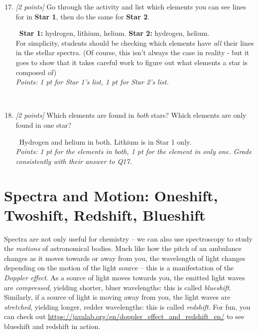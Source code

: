 \documentclass[11pt]{article}
\newcommand{\ans}[1]{%
  \par\smallskip\noindent{\color{blue!55!black}\textbf{Answer:}}\ #1\par\smallskip}
\begin{document}
\begin{enumerate}
    \setcounter{enumi}{16}

    \item \textit{[2 points]} Go through the activity and list which elements you can see lines for
    in \textbf{Star 1}, then do the same for \textbf{Star 2}. 

    \ans{\textbf{Star 1:} hydrogen, lithium, helium. \textbf{Star 2:} hydrogen,
    helium.  \\ For simplicity, students should be checking which elements
    have \textit{all} their lines in the stellar spectra. (Of course, this isn't always
    the case in reality - but it goes to show that it takes careful work to figure out
    what elements a star is composed of)
    \\[2pt]
    \emph{Points: 1 pt for Star 1's list, 1 pt for Star 2's list.}
    } \\


    \item \textit{[2 points]} Which elements are found in \emph{both} stars? Which elements are only found in one star?

    \ans{Hydrogen and helium in both. Lithium is in Star 1 only.
    \\[2pt]
    \emph{Points: 1 pt for the elements in both, 1 pt for the element in only
    one. Grade consistently with their answer to Q17.}}
\end{enumerate}


\section{Spectra and Motion: Oneshift, Twoshift, Redshift, Blueshift}

Spectra are not only useful for chemistry -- we can also use spectroscopy to study the \emph{motions} of astronomical bodies. Much like how the pitch of an ambulance changes as it moves towards or away from you, the wavelength of light changes depending on the motion of the light source -- this is a manifestation of the \emph{Doppler effect}. As a source of light moves towards you, the emitted light waves are \emph{compressed}, yielding shorter, bluer wavelengths: this is called \emph{blueshift}. Similarly, if a source of light is moving away from you, the light waves are \emph{stretched}, yielding longer, redder wavelengths: this is called \emph{redshift}. For fun, you can check out \url{https://javalab.org/en/doppler_effect_and_redshift_en/} to see blueshift and redshift in action.
\end{document}
